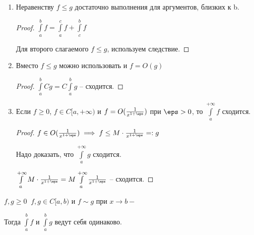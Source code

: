 \begin{remark}

    \begin{enumerate}
    
        \item Неравенству $f \le g$ достаточно выполнения для аргументов, близких к b.

        \begin{proof} \thmslashn

            $\int\limits_{a}^{b} f = \int\limits_{a}^{c} f + \int\limits_{c}^{b} f$
    
            Для второго слагаемого $f \le g$, используем следствие.
        \end{proof}
    
        \item Вместо $f \le g$ можно использовать и $f = O(g)$

        \begin{proof} \thmslashn

            $\int\limits_{a}^{b} Cg = C \int\limits_{a}^{b} g $ -- сходится.

        \end{proof}
    
        \item Если $f \ge 0$, $f \in C[a,+\infty)$ и $f = O(\frac1{x^{1+\eps}})$ при $\eps > 0$, то $\int\limits_{a}^{+\infty} f $ сходится.

        \begin{proof} \thmslashn

            $f \in O(\frac1{x^{1+\eps}}) \implies f \le M\cdot \frac1{x^{1+\eps}} =: g$
			
			Надо доказать, что $\int\limits_a^{+\infty} g$ сходится.
			
			$\int\limits_a^{+\infty}  M\cdot \frac1{x^{1+\eps}} = M\int\limits_a^{+\infty} \frac1{x^{1+\eps}}$ -- сходится.

        \end{proof}

    \end{enumerate}

\end{remark}

\begin{consequence} \thmslashn

    $f, g \ge 0 \;\; f,g \in C[a,b)$ и $f \sim g$ при $x \to b-$
		
    Тогда $\int\limits_a^b f$ и $\int\limits_a^b g$ ведут себя одинаково.

\end{consequence}

